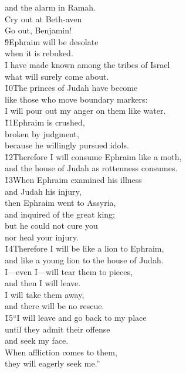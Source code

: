 \begin{poetry}
\poemll    and the alarm in Ramah. \\
\poeml Cry out at Beth-aven \\
\poemll    Go out, Benjamin! \\
\poeml \v{9}Ephraim will be desolate \\
\poemll    when it is rebuked. \\
\poeml I have made known among the tribes of Israel \\
\poemll    what will surely come about. \\
\poeml \v{10}The princes of Judah have become \\
\poemll    like those who move boundary markers: \\
\poemlll       I will pour out my anger on them like water. \\
\poeml \v{11}Ephraim is crushed, \\
\poemll    broken by judgment, \\
\poemlll       because he willingly pursued idols. \\
\poeml \v{12}Therefore I will consume Ephraim like a moth, \\
\poemll    and the house of Judah as rottenness consumes. \\
\poeml \v{13}When Ephraim examined his illness \\
\poemll    and Judah his injury, \\
\poeml then Ephraim went to Assyria, \\
\poemll    and inquired of the great king; \\
\poeml but he could not cure you \\
\poemll    nor heal your injury. \\
\poeml \v{14}Therefore I will be like a lion to Ephraim, \\
\poemll    and like a young lion to the house of Judah. \\
\poeml I---even I---will tear them to pieces, \\
\poemll    and then I will leave. \\
\poeml I will take them away, \\
\poemll    and there will be no rescue. \\
\poeml \v{15}``I will leave and go back to my place \\
\poemll    until they admit their offense \\
\poemlll       and seek my face. \\
\poeml When affliction comes to them, \\
\poemll    they will eagerly seek me.''
\end{poetry}

